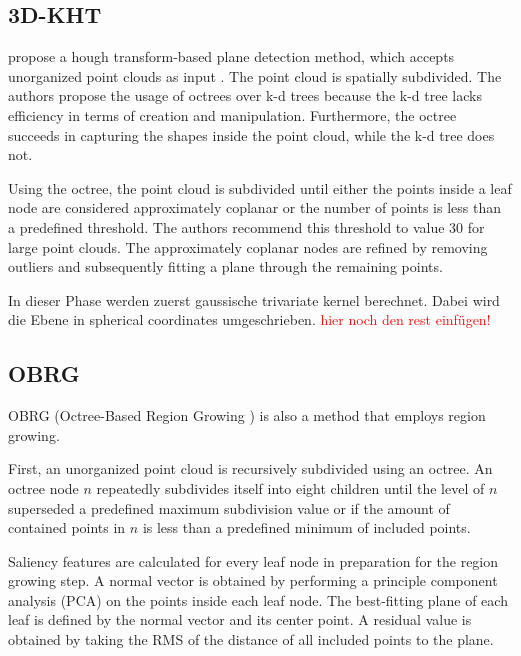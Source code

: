 \documentclass[main.tex]{subfiles}
\begin{document}
\subsection{3D-KHT}\label{sub:3dkht}
\citeauthor{Limberger_Oliveira_2015} propose a hough transform-based plane detection method, which accepts unorganized point clouds as input \cite{Limberger_Oliveira_2015}.
The point cloud is spatially subdivided. The authors propose the usage of octrees over k-d trees because the k-d tree lacks efficiency in terms of 
creation and manipulation. Furthermore, the octree succeeds in capturing the shapes inside the point cloud, while the k-d tree does not.   

Using the octree, the point cloud is subdivided until either the points inside a leaf node are considered approximately coplanar or the number of points is less than 
a predefined threshold. The authors recommend this threshold to value 30 for large point clouds.
The approximately coplanar nodes are refined by removing outliers and subsequently fitting a plane through the remaining points.


In dieser Phase werden zuerst gaussische trivariate kernel berechnet. Dabei wird die Ebene in spherical coordinates umgeschrieben.
\textcolor{red}{hier noch den rest einfügen!}

\subsection{OBRG} \label{sec:bg-obrg}
OBRG (Octree-Based Region Growing \cite{Vo_Truong-Hong_Laefer_Bertolotto_2015}) is also a method that employs region growing.

First, an unorganized point cloud is recursively subdivided using an octree. 
An octree node $n$ repeatedly subdivides itself into eight children until the level of $n$ superseded a predefined maximum subdivision value or if the
amount of contained points in $n$ is less than a predefined minimum of included points.  

Saliency features are calculated for every leaf node in preparation for the region growing step. A normal vector is obtained by performing a principle 
component analysis (PCA) on the points inside each leaf node. The best-fitting plane of each leaf is defined by the normal vector and its center point.
A residual value is obtained by taking the RMS of the distance of all included points to the plane.
\end{document}
